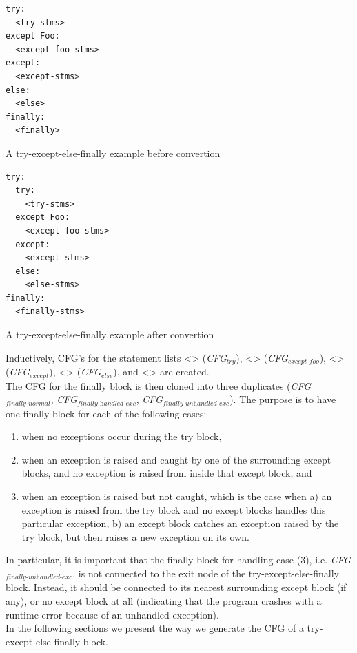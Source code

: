 \begin{listing}[H]
	\begin{verbatim}
try:
  <try-stms>
except Foo:
  <except-foo-stms>
except:
  <except-stms>
else: 
  <else>
finally:
  <finally>
	\end{verbatim}
	\caption{A try-except-else-finally example before convertion}\label{code:tryExceptBefore}
\end{listing}

\begin{listing}[H]
	\begin{verbatim}
try: 
  try:
    <try-stms>
  except Foo:
    <except-foo-stms>
  except:
    <except-stms>
  else:
    <else-stms>
finally:
  <finally-stms>
	\end{verbatim}
	\caption{A try-except-else-finally example after convertion}\label{code:tryExceptAfter}
\end{listing}

Inductively, CFG's for the statement lists <> (\textit{CFG$_{\textit{try}}$}), <> (\textit{CFG$_{\textit{except-foo}}$}), <> (\textit{CFG$_{\textit{except}}$}), <> (\textit{CFG$_{\textit{else}}$}), and <> are created. \\
The CFG for the finally block is then cloned into three duplicates (\textit{CFG$_{\textit{finally-normal}}$}, \textit{CFG$_{\textit{finally-handled-exc}}$}, \textit{CFG$_{\textit{finally-unhandled-exc}}$}). The purpose is to have one finally block for each of the following cases: 

\begin{enumerate}
  \item when no exceptions occur during the try block,
  \item when an exception is raised and caught by one of the surrounding except blocks, and no exception is raised from inside that except block, and
  \item when an exception is raised but not caught, which is the case when a) an exception is raised from
the try block and no except blocks handles this particular exception, b) an except block catches an exception raised by the try block, but then raises a new exception on its own.
\end{enumerate}

In particular, it is important that the finally block for handling case (3), i.e. \textit{CFG$_{\textit{finally-unhandled-exc}}$}, is not connected to the exit node of the try-except-else-finally block. Instead, it should be connected to its nearest surrounding except block (if any), or no except block at all (indicating that the program crashes with a runtime error because of an unhandled exception). \\
In the following sections we present the way we generate the CFG of a try-except-else-finally block.

